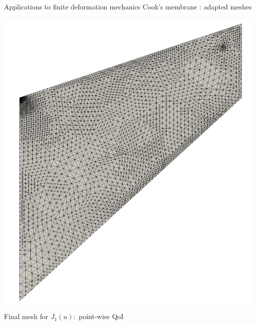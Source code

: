 \documentclass[fleqn]{beamer}
\begin{document}

\begin{frame}{Applications to finite deformation mechanics}
{Cook's membrane : adapted meshes}
\scriptsize
\begin{minipage}{0.5\textwidth}
\centering
\includegraphics[width=0.99\textwidth]{../img/mech_cooks_pw_final_mesh} \\
Final mesh for $J_1(u):$ point-wise QoI
\end{minipage}%
\begin{minipage}{0.5\textwidth}
\centering

\end{minipage}
\end{frame}
\end{document}
